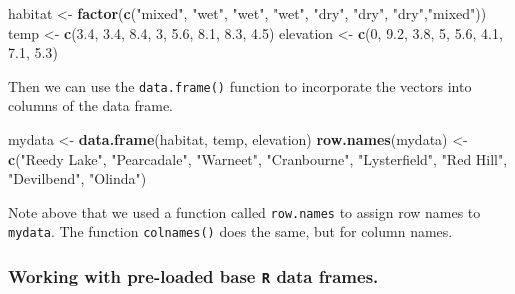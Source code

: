 \documentclass[]{book}
\newenvironment{Shaded}{\begin{snugshade}}{\end{snugshade}}
\newcommand{\DecValTok}[1]{\textcolor[rgb]{0.00,0.00,0.81}{#1}}
\newcommand{\FloatTok}[1]{\textcolor[rgb]{0.00,0.00,0.81}{#1}}
\newcommand{\KeywordTok}[1]{\textcolor[rgb]{0.13,0.29,0.53}{\textbf{#1}}}
\newcommand{\NormalTok}[1]{#1}
\newcommand{\StringTok}[1]{\textcolor[rgb]{0.31,0.60,0.02}{#1}}
\begin{document}
\begin{Shaded}
\begin{Highlighting}[]
\NormalTok{habitat <-}\StringTok{ }\KeywordTok{factor}\NormalTok{(}\KeywordTok{c}\NormalTok{(}\StringTok{"mixed"}\NormalTok{, }\StringTok{"wet"}\NormalTok{, }\StringTok{"wet"}\NormalTok{, }\StringTok{"wet"}\NormalTok{, }\StringTok{"dry"}\NormalTok{, }\StringTok{"dry"}\NormalTok{, }\StringTok{"dry"}\NormalTok{,}\StringTok{"mixed"}\NormalTok{))}
\NormalTok{temp <-}\StringTok{ }\KeywordTok{c}\NormalTok{(}\FloatTok{3.4}\NormalTok{, }\FloatTok{3.4}\NormalTok{, }\FloatTok{8.4}\NormalTok{, }\DecValTok{3}\NormalTok{, }\FloatTok{5.6}\NormalTok{, }\FloatTok{8.1}\NormalTok{, }\FloatTok{8.3}\NormalTok{, }\FloatTok{4.5}\NormalTok{)}
\NormalTok{elevation <-}\StringTok{ }\KeywordTok{c}\NormalTok{(}\DecValTok{0}\NormalTok{, }\FloatTok{9.2}\NormalTok{, }\FloatTok{3.8}\NormalTok{, }\DecValTok{5}\NormalTok{, }\FloatTok{5.6}\NormalTok{, }\FloatTok{4.1}\NormalTok{, }\FloatTok{7.1}\NormalTok{, }\FloatTok{5.3}\NormalTok{)}
\end{Highlighting}
\end{Shaded}

Then we can use the \texttt{data.frame()} function to incorporate the vectors into columns of the data frame.

\begin{Shaded}
\begin{Highlighting}[]
\NormalTok{mydata <-}\StringTok{ }\KeywordTok{data.frame}\NormalTok{(habitat, temp, elevation)}
\KeywordTok{row.names}\NormalTok{(mydata) <-}\StringTok{ }\KeywordTok{c}\NormalTok{(}\StringTok{"Reedy Lake"}\NormalTok{, }\StringTok{"Pearcadale"}\NormalTok{, }\StringTok{"Warneet"}\NormalTok{, }\StringTok{"Cranbourne"}\NormalTok{, }
                       \StringTok{"Lysterfield"}\NormalTok{, }\StringTok{"Red Hill"}\NormalTok{, }\StringTok{"Devilbend"}\NormalTok{, }\StringTok{"Olinda"}\NormalTok{)}
\end{Highlighting}
\end{Shaded}

Note above that we used a function called \texttt{row.names} to assign row names to \texttt{mydata}. The function \texttt{colnames()} does the same, but for column names.

\hypertarget{working-with-pre-loaded-base-r-data-frames.}{%
\subsubsection{\texorpdfstring{Working with pre-loaded base \texttt{R} data frames.}{Working with pre-loaded base R data frames.}}\label{working-with-pre-loaded-base-r-data-frames.}}
\end{document}
